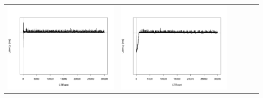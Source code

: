 \begin{table}[htbp]
{\begin{tabular}{l | ccccc}
\begin{minipage}{.15\textwidth}
     			 	\includegraphics[width=\linewidth]{images/lat-log-triple/N12}
    				 \end{minipage}
    			   &	 \begin{minipage}{.15\textwidth}\vspace{2pt}     							
     			 	\includegraphics[width=\linewidth]{images/lat-log-triple/N14}
    				 \end{minipage}
    			   &	 \begin{minipage}{.15\textwidth}\vspace{2pt}     							

\end{minipage}
\end{tabular}}
\end{table}
